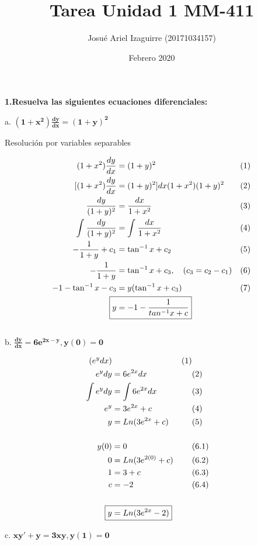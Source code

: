 \documentclass{article}
\title{Tarea Unidad 1 MM-411}
\author{Josué Ariel Izaguirre (20171034157)}
\date{Febrero 2020}
\begin{document}
    \maketitle
    \begin{flushleft}
        \textbf{1.Resuelva las siguientes ecuaciones diferenciales:} \break
        
        
        \hspace{10mm} a. $
            \boldsymbol{\left( 1+x^2 \right) \frac{dy}{dx} = \left(1+y \right)^2}
            $  \break

            \hspace{10mm} Resolución por variables separables \break

                \begin{align*}
                    ( 1+x^2 ) \frac{dy}{dx} & = (1+y )^2  &&\text{(1)}\\
                    [ ( 1+x^2 ) \frac{dy}{dx} & = (1+y)^2 ] {dx}{(1+x^2)(1+y)^2} &&\text{(2)}\\
                    \frac{dy}{(1+y)^2} & = \frac{dx}{1+x^2} &&\text{(3)}\\
                    \int_{}^{} \frac{dy}{(1+y)^2} & = \int_{}^{} \frac{dx}{1+x^2} &&\text{(4)}\\
                    -\frac{1}{1+y} + c_1 & = \tan ^ {-1} {x} + c_2 &&\text{(5)}\\
                    -\frac{1}{1+y} & = \tan ^ {-1} {x} + c_3, \quad (c_3 = c_2 - c_1) &&\text{(6)} \\
                    -1 - \tan ^ {-1} {x} - c_3 & = y ( \tan ^ {-1} {x} + c_{3} ) &&\text{(7)} \\
                    \Aboxed{y & = -1 - \frac{1}{tan ^{-1}x + c}}
                \end{align*}\\

        \hspace{10mm} b. $
            \boldsymbol{\frac{dy}{dx} = 6e^{2x-y} , y(0) = 0}
            $  \break

            \begin{align*}
                [ \frac{dy}{dx} & = 6\frac{e^{2x}}{e^y} ] (e^y dx) && \text{(1)} \\
                e^y dy & = 6e^{2x} dx && \text{(2)} \\
                \int e^y dy & = \int 6e^{2x} dx && \text{(3)} \\
                e^y & = 3e^{2x} + c && \text{(4)} \\
                y & = Ln(3e^{2x} + c) && \text{(5)} \\
                \\
                y(0) & = 0 && \text{(6.1)} \\
                0 & = Ln(3e^{2(0)} + c) && \text{(6.2)} \\
                1 & = 3 + c && \text{(6.3)} \\
                c & = -2 && \text{(6.4)}\\
                \\
                \Aboxed{y &= Ln(3e^{2x}-2)}
            \end{align*}

        \hspace{10mm} c. $
            \boldsymbol{ xy' + y = 3xy , y(1) = 0}
            $  \break
    \end{flushleft}
\end{document}

